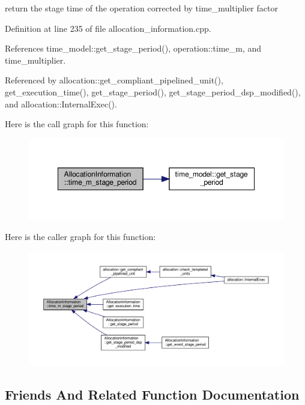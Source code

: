 return the stage time of the operation corrected by time\+\_\+multiplier factor 



Definition at line 235 of file allocation\+\_\+information.\+cpp.



References time\+\_\+model\+::get\+\_\+stage\+\_\+period(), operation\+::time\+\_\+m, and time\+\_\+multiplier.



Referenced by allocation\+::get\+\_\+compliant\+\_\+pipelined\+\_\+unit(), get\+\_\+execution\+\_\+time(), get\+\_\+stage\+\_\+period(), get\+\_\+stage\+\_\+period\+\_\+dsp\+\_\+modified(), and allocation\+::\+Internal\+Exec().

Here is the call graph for this function\+:
\nopagebreak
\begin{figure}[H]
\begin{center}
\leavevmode
\includegraphics[width=348pt]{d7/d79/classAllocationInformation_affde532d961cc0d77553c6ce12e0cc6b_cgraph}
\end{center}
\end{figure}
Here is the caller graph for this function\+:
\nopagebreak
\begin{figure}[H]
\begin{center}
\leavevmode
\includegraphics[width=350pt]{d7/d79/classAllocationInformation_affde532d961cc0d77553c6ce12e0cc6b_icgraph}
\end{center}
\end{figure}


\subsection{Friends And Related Function Documentation}
\mbox{\label{classAllocationInformation_a2dc219c556df071c0061c3e9ddfa1dca}} 
